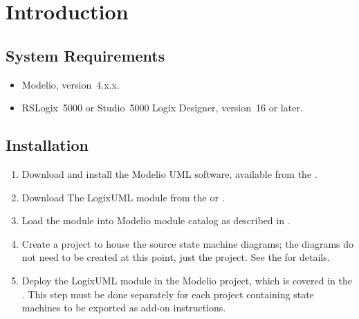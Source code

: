 \section{Introduction}


\subsection{System Requirements}

\begin{itemize}
  \item Modelio, version~4.x.x.

  \item RSLogix~5000 or Studio~5000 Logix Designer, version~16 or later.
\end{itemize}


\subsection{Installation}

\begin{enumerate}
  \item Download and install the Modelio UML software, available from the
    \textcite{MODELIO}.

  \item Download The LogixUML module from the \textcite{MODELIOSTORE} or
    \textcite{REPO}.

  \item Load the module into Modelio module catalog as described in
    \textcite[Macros catalog]{MODELIOMANUAL}.

  \item Create a project to house the source state machine diagrams;
    the diagrams do not need to be created at this point, just the project.
    See the \textcite[Creating a project]{MODELIOMANUAL} for details.

  \item Deploy the LogixUML module in the Modelio project, which is covered
    in the \textcite[Configuring project modules]{MODELIOMANUAL}.
    This step must be done separately for each project containing state
    machines to be exported as add-on instructions.
\end{enumerate}
